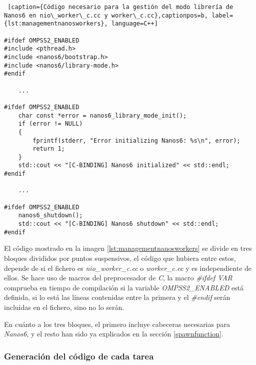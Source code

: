 \begin{lstlisting} [caption={Código necesario para la gestión del modo librería de Nanos6 en nio\_worker\_c.cc y worker\_c.cc},captionpos=b, label={lst:managementnanosworkers}, language=C++]

#ifdef OMPSS2_ENABLED
#include <pthread.h>
#include <nanos6/bootstrap.h>
#include <nanos6/library-mode.h>
#endif

    ...

#ifdef OMPSS2_ENABLED
    char const *error = nanos6_library_mode_init();
    if (error != NULL)
    {
        fprintf(stderr, "Error initializing Nanos6: %s\n", error);
        return 1;
    }
    std::cout << "[C-BINDING] Nanos6 initialized" << std::endl;
#endif

    ...
    
#ifdef OMPSS2_ENABLED
    nanos6_shutdown();
    std::cout << "[C-BINDING] Nanos6 shutdown" << std::endl;
#endif

\end{lstlisting}

El código mostrado en la imagen \ref{lst:managementnanosworkers} se divide en tres bloques divididos por puntos suspensivos, el código que hubiera entre estos, depende de si el fichero es \textit{nio\_worker\_c.cc} o \textit{worker\_c.cc} y es independiente de ellos. Se hace uso de macros del preprocesador de \textit{C}, la macro \textit{\#ifdef VAR} comprueba en tiempo de compilación si la variable \textit{OMPSS2\_ENABLED} está definida, si lo está las líneas contenidas entre la primera y el \textit{\#endif} serán incluidas en el fichero, sino no lo serán.
\par\medskip

En cuánto a los tres bloques, el primero incluye cabeceras necesarias para \textit{Nanos6}, y el resto han sido ya explicados en la sección \ref{spawnfunction}.

\subsubsection{Generación del código de cada tarea}

